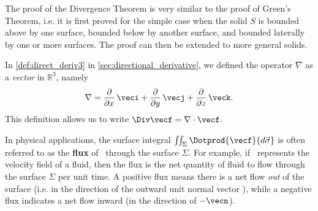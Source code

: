 
The proof of the Divergence Theorem is very similar to the proof of Green's Theorem, i.e. it is first proved for the simple case when the solid $S$ is bounded above by one surface, bounded below by another surface, and bounded laterally by one or more surfaces. The proof can then be extended to more general solids.%

In \autoref{def:direct_deriv3} in \autoref{sec:directional_derivative}, we defined the operator $\nabla$ as a \emph{vector} in $\mathbb{R}^3$, namely\index{$\nabla$}
\[
 \nabla = \frac{\partial}{\partial x}\,\veci + \frac{\partial}{\partial y}\,\vecj +
   \frac{\partial}{\partial z}\,\veck .
\]
This definition allows us to write $\Div\vecf=\nabla\cdot\vecf$.


In physical applications, the surface integral $\iint_{\Sigma} \Dotprod{\vecf}{d\vec\sigma}$ is often referred to as the \textbf{flux} of \vecf\ through the surface $\Sigma$. For example, if \vecf\ represents the velocity field of a fluid, then the flux is the net quantity of fluid to flow through the surface $\Sigma$ per unit time. A positive flux means there is a net flow \emph{out} of the surface (i.e. in the direction of the outward unit normal vector \vecn), while a negative flux indicates a net flow inward (in the direction of $-\vecn$).

